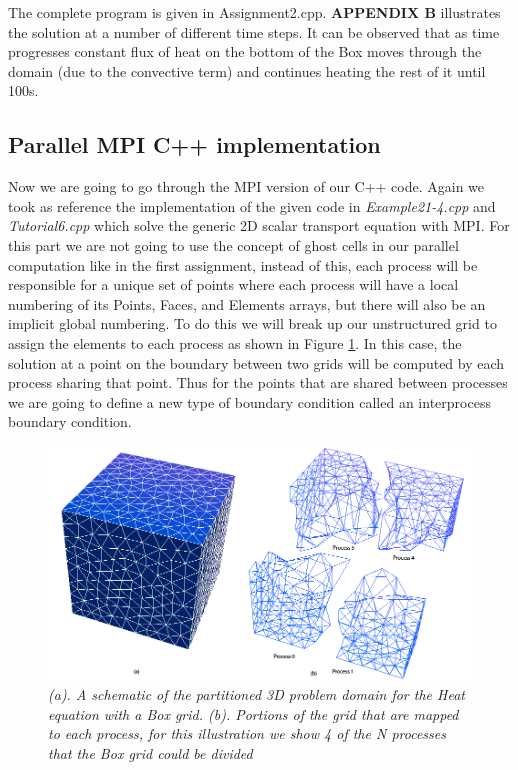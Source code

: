 \documentclass[12pt]{article}
\begin{document}
The complete program is given in Assignment2.cpp. \textbf{APPENDIX B} illustrates the solution at a number of different time steps. It can be observed that as time progresses constant flux of heat on the bottom of the Box moves through
the domain (due to the convective term) and continues heating the rest of it until 100s.

\subsection{Parallel MPI C++ implementation}
Now we are going to go through the MPI version of our C++ code. Again we took as reference the implementation of the given code in \textit{Example21-4.cpp} and \textit{Tutorial6.cpp} which solve the generic 2D scalar transport equation with MPI. For this part we are not going to use the concept of ghost cells in our parallel computation like in the first assignment, instead of this, each process will be responsible for a unique set of points where each process will have a local numbering of its Points, Faces, and Elements arrays, but there will also be an implicit global numbering. To do this we will break up our unstructured grid to assign the elements to each process as shown in Figure \ref{fig:boxpartition}. In this case, the solution at a point on the boundary between two grids will be computed by each process sharing that point. Thus for the points that are shared between processes we are going to define a new type of boundary condition called an interprocess boundary condition.

	\begin{figure}[H]
    \includegraphics[scale=0.5]{Box.png}
    \centering
    \caption{\textit{(a). A schematic of the partitioned 3D problem domain for the Heat equation with a Box grid. (b). Portions of the grid that are mapped to each process, for this illustration we show 4 of the N processes that the Box grid could be divided}}
    \label{fig:boxpartition}
	\end{figure}	
\end{document}
